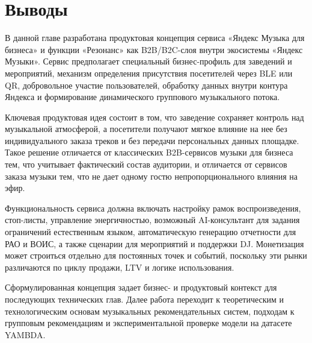 \section{Выводы}
\label{sec:service:conclusion}

В данной главе разработана продуктовая концепция сервиса «Яндекс Музыка для бизнеса» и функции «Резонанс» как B2B/B2C-слоя внутри экосистемы «Яндекс Музыки». Сервис предполагает специальный бизнес-профиль для заведений и мероприятий, механизм определения присутствия посетителей через BLE или QR, добровольное участие пользователей, обработку данных внутри контура Яндекса и формирование динамического группового музыкального потока.

Ключевая продуктовая идея состоит в том, что заведение сохраняет контроль над музыкальной атмосферой, а посетители получают мягкое влияние на нее без индивидуального заказа треков и без передачи персональных данных площадке. Такое решение отличается от классических B2B-сервисов музыки для бизнеса тем, что учитывает фактический состав аудитории, и отличается от сервисов заказа музыки тем, что не дает одному гостю непропорционального влияния на эфир.

Функциональность сервиса должна включать настройку рамок воспроизведения, стоп-листы, управление энергичностью, возможный AI-консультант для задания ограничений естественным языком, автоматическую генерацию отчетности для РАО и ВОИС, а также сценарии для мероприятий и поддержки DJ. Монетизация может строиться отдельно для постоянных точек и событий, поскольку эти рынки различаются по циклу продажи, LTV и логике использования.

Сформулированная концепция задает бизнес- и продуктовый контекст для последующих технических глав. Далее работа переходит к теоретическим и технологическим основам музыкальных рекомендательных систем, подходам к групповым рекомендациям и экспериментальной проверке модели на датасете YAMBDA.
